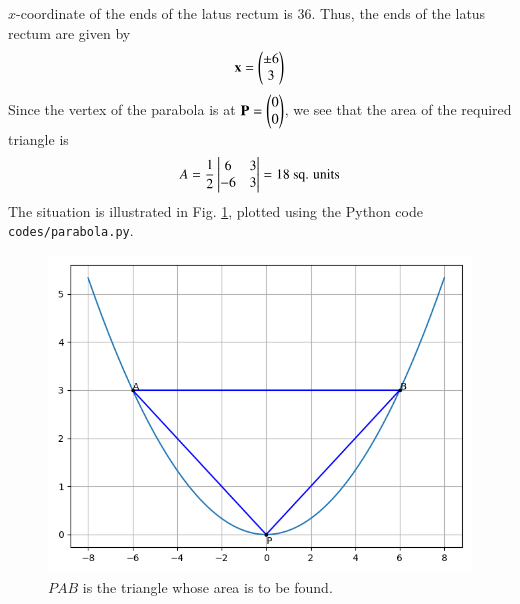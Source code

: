 \documentclass[journal,12pt,twocolumn]{IEEEtran}
\renewcommand{\vec}[1]{\boldsymbol{\mathbf{#1}}}
\begin{document}
\begin{enumerate}
    $x$-coordinate of the ends of the latus rectum is 36. Thus, the ends of the 
    latus rectum are given by
    \begin{align}
        \vec{x} = \myvec{\pm 6\\3}
    \end{align}
    Since the vertex of the parabola is at $\vec{P} = \myvec{0\\0}$,
    we see that the area of the required triangle is
    \begin{align}
        A = \frac{1}{2}\begin{vmatrix}6&3\\-6&3\end{vmatrix} = 18\ \textrm{sq. units}
    \end{align}
    The situation is illustrated in Fig. \ref{fig:parabola}, plotted using the
    Python code \texttt{codes/parabola.py}.
    \begin{figure}[!ht]
        \centering
        \includegraphics[width=\columnwidth]{figs/parabola.png}
        \caption{$PAB$ is the triangle whose area is to be found.}
        \label{fig:parabola}
    \end{figure}
\end{enumerate}
\end{document}
